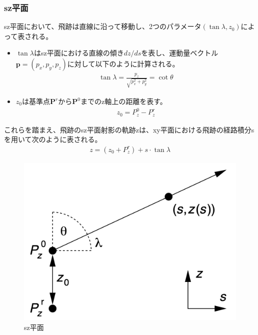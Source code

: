 \subsubsection{sz平面}
sz平面において、飛跡は直線に沿って移動し、2つのパラメータ$(\tan \lambda, z_0)$によって表される。
\begin{itemize}
\item $\tan \lambda$はsz平面における直線の傾き$dz/ds$を表し、運動量ベクトル $\mathbf{p} = \left( p_x, p_y, p_z \right)$に対して以下のように計算される。
\begin{align}
\tan \lambda =\frac{p_z}{\sqrt{p_x^2 + p_y^2}} = \cot \theta
\end{align}
\item $z_0$は基準点$\mathbf{P}^r$から$\mathbf{P}^0$までのz軸上の距離を表す。\\
\begin{align}
z_0 = P_z^0 - P_z^r
\end{align}
\end{itemize}
これらを踏まえ、飛跡のsz平面射影の軌跡zは、xy平面における飛跡の経路積分sを用いて次のように表される。
\begin{align}
z = ( z_0 + P_z^r) + s \cdot \tan \lambda
\end{align}
\begin{figure}[H]
	\begin{center}
 \includegraphics[keepaspectratio, scale=0.4]
 	{Figure/Appendix/sz.png}
 		\caption{sz平面}
 		\label{sz}
	\end{center}
\end{figure}
